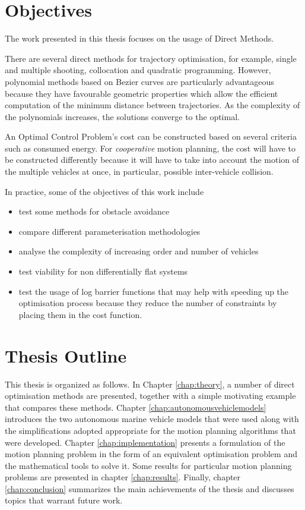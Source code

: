 \section{Objectives}

\par The work presented in this thesis focuses on the usage of Direct Methods.
\par There are several direct methods for trajectory optimisation, for example, single and multiple shooting, collocation and quadratic programming. However, polynomial methods based on Bezier curves are particularly advantageous because they have favourable geometric properties which allow the efficient computation of the minimum distance between trajectories. As the complexity of the polynomials increases, the solutions converge to the optimal. \cite{cichella2018bernstein}
\par An Optimal Control Problem's cost can be constructed based on several criteria such as consumed energy. For \textit{cooperative} motion planning, the cost will have to be constructed differently because it will have to take into account the motion of the multiple vehicles at once, in particular, possible inter-vehicle collision.
\par In practice, some of the objectives of this work include
\begin{itemize}
    \item test some methods for obstacle avoidance
    \item compare different parameterisation methodologies
    \item analyse the complexity of increasing order and number of vehicles
    \item test viability for non differentially flat systems
    \item test the usage of log barrier functions that may help with speeding up the optimisation process because they reduce the number of constraints by placing them in the cost function.
\end{itemize}


\section{Thesis Outline}

This thesis is organized as follows.  In Chapter \ref{chap:theory}, a number of direct optimisation methods are presented, together with a simple motivating example that compares these methods. Chapter \ref{chap:autonomousvehiclemodels} introduces the two autonomous marine vehicle models that were used along with the simplifications adopted appropriate for the motion planning algorithms that were developed. Chapter \ref{chap:implementation} presents a formulation of the motion planning problem in the form of an equivalent optimisation problem and the mathematical tools to solve it. Some results for particular motion planning problems are presented in chapter \ref{chap:results}. Finally, chapter \ref{chap:conclusion} summarizes the main achievements of the thesis and discusses topics that warrant future work.

